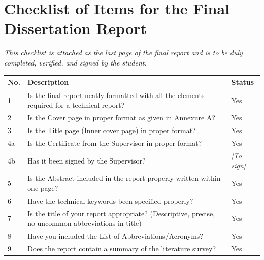 \documentclass[12pt,a4paper]{article}
\begin{document}
\newpage
\pagestyle{plain}
\section*{Checklist of Items for the Final Dissertation Report}

\begin{singlespace}
\noindent\textit{This checklist is attached as the last page of the final report and is to be duly completed, verified, and signed by the student.}

\vspace{0.5cm}
\noindent
\begin{longtable}{@{}p{}p{}p{}@{}}
\toprule
\textbf{No.} & \textbf{Description} & \textbf{Status} \\
\midrule
\endhead
1   & Is the final report neatly formatted with all the elements required for a technical report?              & Yes \\[4pt]
2   & Is the Cover page in proper format as given in Annexure A?                                               & Yes \\[4pt]
3   & Is the Title page (Inner cover page) in proper format?                                                   & Yes \\[4pt]
4a  & Is the Certificate from the Supervisor in proper format?                                                  & Yes \\[4pt]
4b  & Has it been signed by the Supervisor?                                                                     & \textit{[To sign]} \\[4pt]
5   & Is the Abstract included in the report properly written within one page?                                  & Yes \\[4pt]
6   & Have the technical keywords been specified properly?                                                      & Yes \\[4pt]
7   & Is the title of your report appropriate? (Descriptive, precise, no uncommon abbreviations in title)      & Yes \\[4pt]
8   & Have you included the List of Abbreviations/Acronyms?                                                    & Yes \\[4pt]
9   & Does the report contain a summary of the literature survey?                                              & Yes \\[4pt]

\end{longtable}
\end{singlespace}
\end{document}
